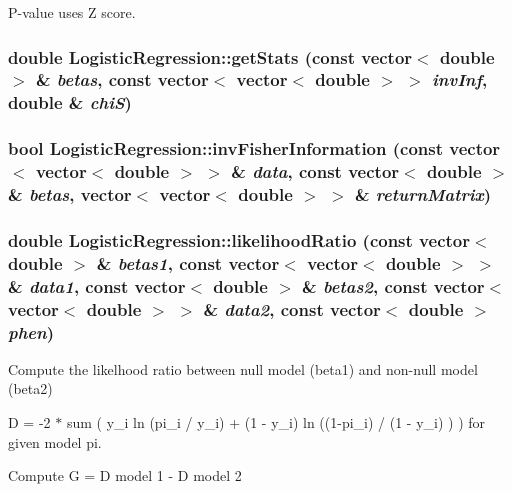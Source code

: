 P-\/value uses Z score. \hypertarget{classLogisticRegression_a1dd5a75892af3383871e591c8ccb7905}{
\subsubsection[{getStats}]{\setlength{\rightskip}{0pt plus 5cm}double LogisticRegression::getStats (const vector$<$ double $>$ \& {\em betas}, \/  const vector$<$ vector$<$ double $>$ $>$ {\em invInf}, \/  double \& {\em chiS})}}
\label{classLogisticRegression_a1dd5a75892af3383871e591c8ccb7905}
\hypertarget{classLogisticRegression_ab61a51b6ca0816938b59bde88bc1082d}{
\subsubsection[{invFisherInformation}]{\setlength{\rightskip}{0pt plus 5cm}bool LogisticRegression::invFisherInformation (const vector$<$ vector$<$ double $>$ $>$ \& {\em data}, \/  const vector$<$ double $>$ \& {\em betas}, \/  vector$<$ vector$<$ double $>$ $>$ \& {\em returnMatrix})}}
\label{classLogisticRegression_ab61a51b6ca0816938b59bde88bc1082d}
\hypertarget{classLogisticRegression_a614dd5ad7eece3237edc37b56fced349}{
\subsubsection[{likelihoodRatio}]{\setlength{\rightskip}{0pt plus 5cm}double LogisticRegression::likelihoodRatio (const vector$<$ double $>$ \& {\em betas1}, \/  const vector$<$ vector$<$ double $>$ $>$ \& {\em data1}, \/  const vector$<$ double $>$ \& {\em betas2}, \/  const vector$<$ vector$<$ double $>$ $>$ \& {\em data2}, \/  const vector$<$ double $>$ {\em phen})}}
\label{classLogisticRegression_a614dd5ad7eece3237edc37b56fced349}
Compute the likelhood ratio between null model (beta1) and non-\/null model (beta2)

D = -\/2 $\ast$ sum ( y\_\-i ln (pi\_\-i / y\_\-i) + (1 -\/ y\_\-i) ln ((1-\/pi\_\-i) / (1 -\/ y\_\-i) ) ) for given model pi.

Compute G = D model 1 -\/ D model 2

